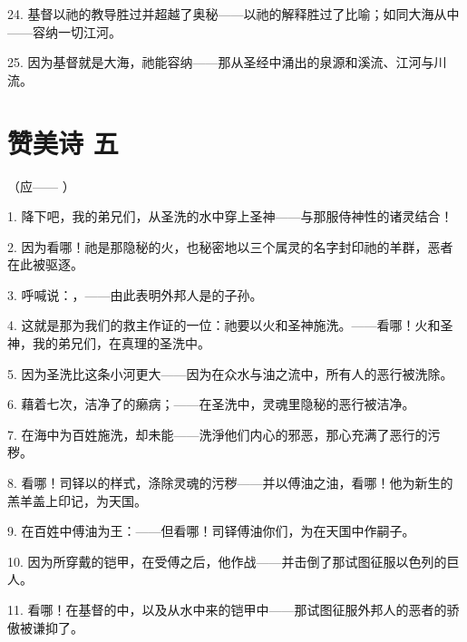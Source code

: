 24. 基督以祂的教导胜过并超越了奥秘——以祂的解释胜过了比喻；如同大海从中——容纳一切江河。\par

25. 因为基督就是大海，祂能容纳——那从圣经中涌出的泉源和溪流、江河与川流。\par


\section{赞美诗 五}

（应—— ）\par

1. 降下吧，我的弟兄们，从圣洗的水中穿上圣神——与那服侍神性的诸灵结合！\par

2. 因为看哪！祂是那隐秘的火，也秘密地以三个属灵的名字封印祂的羊群，恶者在此被驱逐。\par

3. 呼喊说：，——由此表明外邦人是的子孙。\par

4. 这就是那为我们的救主作证的一位：祂要以火和圣神施洗。——看哪！火和圣神，我的弟兄们，在真理的圣洗中。\par

5. 因为圣洗比这条小河更大——因为在众水与油之流中，所有人的恶行被洗除。\par

6. 藉着七次，洁净了的癞病；——在圣洗中，灵魂里隐秘的恶行被洁净。\par

7. 在海中为百姓施洗，却未能——洗淨他们内心的邪恶，那心充满了恶行的污秽。\par

8. 看哪！司铎以的样式，涤除灵魂的污秽——并以傅油之油，看哪！他为新生的羔羊盖上印记，为天国。\par

9. 在百姓中傅油为王：——但看哪！司铎傅油你们，为在天国中作嗣子。\par

10. 因为所穿戴的铠甲，在受傅之后，他作战——并击倒了那试图征服以色列的巨人。\par

11. 看哪！在基督的中，以及从水中来的铠甲中——那试图征服外邦人的恶者的骄傲被谦抑了。\par

